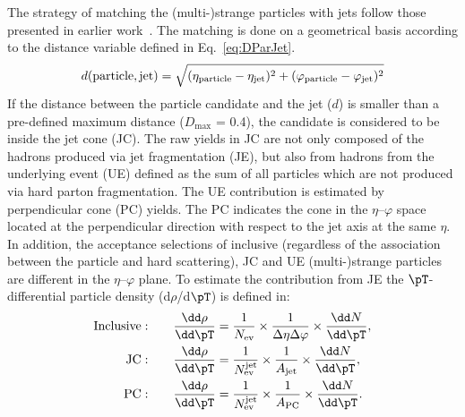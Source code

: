 \documentclass[ALICE,manyauthors]{cernphprep}
\begin{document}
The strategy of matching the (multi-)strange particles with jets follow those presented in earlier work~\cite{Acharya:2021oaa}.
The matching is done on a geometrical basis according to the distance variable defined in Eq.~\ref{eq:DParJet}.
\begin{equation}
d(\mathrm{particle, jet}) = \sqrt{(\eta_\mathrm{particle} -\eta_{\rm jet})^{2} + (\varphi_\mathrm{particle} -\varphi_{\rm jet})^{2}}
\label{eq:DParJet}
\end{equation}
If the distance between the particle candidate and the jet ($d$) is smaller than a pre-defined maximum distance ($D_\mathrm{max}$ = 0.4), the candidate is considered to be inside the jet cone (JC).
The raw yields in JC are not only composed of the hadrons produced via jet fragmentation (JE), but also from hadrons from the underlying event (UE) defined as the sum of all particles which are not produced via hard parton fragmentation.
The UE contribution is estimated by perpendicular cone (PC) yields.
The PC indicates the cone in the $\eta$--$\varphi$ space located at the perpendicular direction with respect to the jet axis at the same $\eta$.
In addition, the acceptance selections of inclusive (regardless of the association between the particle and hard scattering), JC and UE (multi-)strange particles are different in the $\eta$--$\varphi$ plane.
To estimate the contribution from JE the $\pT$-differential particle density (d$\rho$/d$\pT$) is defined in:
\begin{equation}
\begin{split}
{\rm Inclusive:}\qquad & \frac{\dd\rho}{\dd\pT} = \frac{1}{N_{\rm ev}}\times\frac{1}{\Delta\eta\Delta\varphi}\times\frac{\dd N}{\dd\pT}, \\
{\rm JC:}\qquad & \frac{\dd\rho}{\dd\pT} = \frac{1}{N_{\rm ev}^{\rm jet}} \times\frac{1}{A_{\rm jet}}\times\frac{\dd N}{\dd\pT}, \\
{\rm PC:}\qquad & \frac{\dd\rho}{\dd\pT} = \frac{1}{N_{\rm ev}^{\rm jet}} \times\frac{1}{A_{\rm PC}}\times\frac{\dd N}{\dd\pT}. \\
\end{split}
\label{eq:normalize}
\end{equation}
\end{document}
